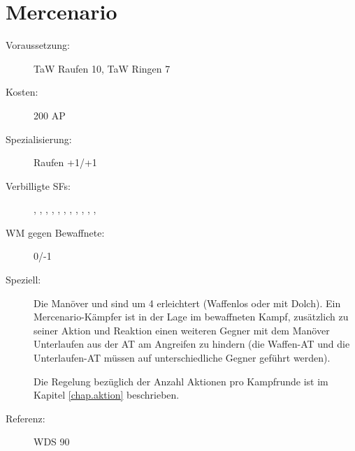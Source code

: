 \section{Mercenario}
\label{uSpez.mercenario}
\begin{description}
    \item[Voraussetzung:]
        TaW Raufen 10, TaW Ringen 7
    \item[Kosten:]
        200 AP
    \item[Spezialisierung:]
        Raufen +1/+1
    \item[Verbilligte SFs:]
        , , , , , , , , , , , 
    \item[WM gegen Bewaffnete:]
        0/-1
    \item[Speziell:]
        Die Manöver  und  sind um 4 erleichtert (Waffenlos oder mit Dolch).
        Ein Mercenario-Kämpfer ist in der Lage im bewaffneten Kampf, zusätzlich zu seiner Aktion und Reaktion einen weiteren Gegner mit dem Manöver Unterlaufen aus der AT am Angreifen zu hindern (die Waffen-AT und die Unterlaufen-AT müssen auf unterschiedliche Gegner geführt werden).

        Die Regelung bezüglich der Anzahl Aktionen pro Kampfrunde ist im Kapitel \ref{chap.aktion} beschrieben.
    \item [Referenz:]
        WDS 90
\end{description}
